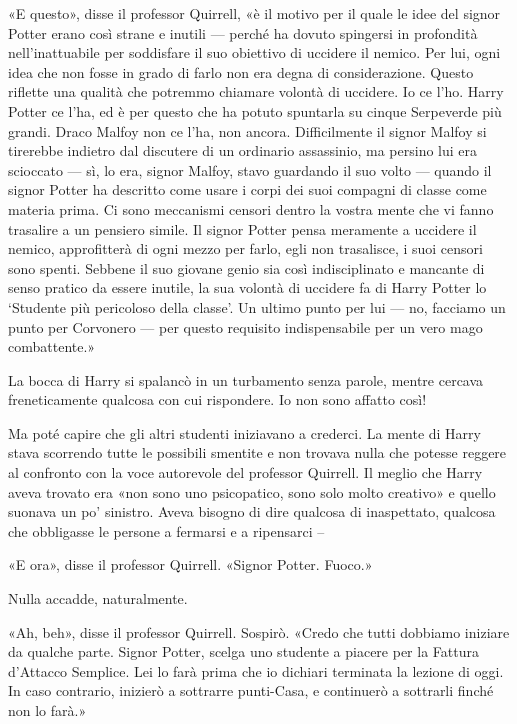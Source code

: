 «E questo», disse il professor Quirrell, «è il motivo per il quale le idee del signor Potter erano così strane e inutili — perché ha dovuto spingersi in profondità nell’inattuabile per soddisfare il suo obiettivo di uccidere il nemico. Per lui, ogni idea che non fosse in grado di farlo non era degna di considerazione. Questo riflette una qualità che potremmo chiamare volontà di uccidere. Io ce l’ho. Harry Potter ce l’ha, ed è per questo che ha potuto spuntarla su cinque Serpeverde più grandi. Draco Malfoy non ce l’ha, non ancora. Difficilmente il signor Malfoy si tirerebbe indietro dal discutere di un ordinario assassinio, ma persino lui era scioccato — sì, lo era, signor Malfoy, stavo guardando il suo volto — quando il signor Potter ha descritto come usare i corpi dei suoi compagni di classe come materia prima. Ci sono meccanismi censori dentro la vostra mente che vi fanno trasalire a un pensiero simile. Il signor Potter pensa meramente a uccidere il nemico, approfitterà di ogni mezzo per farlo, egli non trasalisce, i suoi censori sono spenti. Sebbene il suo giovane genio sia così indisciplinato e mancante di senso pratico da essere inutile, la sua volontà di uccidere fa di Harry Potter lo ‘Studente più pericoloso della classe’. Un ultimo punto per lui — no, facciamo un punto per Corvonero — per questo requisito indispensabile per un vero mago combattente.»

La bocca di Harry si spalancò in un turbamento senza parole, mentre cercava freneticamente qualcosa con cui rispondere. Io non sono affatto così!

Ma poté capire che gli altri studenti iniziavano a crederci. La mente di Harry stava scorrendo tutte le possibili smentite e non trovava nulla che potesse reggere al confronto con la voce autorevole del professor Quirrell. Il meglio che Harry aveva trovato era «non sono uno psicopatico, sono solo molto creativo» e quello suonava un po’ sinistro. Aveva bisogno di dire qualcosa di inaspettato, qualcosa che obbligasse le persone a fermarsi e a ripensarci –

«E ora», disse il professor Quirrell. «Signor Potter. Fuoco.»

Nulla accadde, naturalmente.

«Ah, beh», disse il professor Quirrell. Sospirò. «Credo che tutti dobbiamo iniziare da qualche parte. Signor Potter, scelga uno studente a piacere per la Fattura d’Attacco Semplice. Lei lo farà prima che io dichiari terminata la lezione di oggi. In caso contrario, inizierò a sottrarre punti-Casa, e continuerò a sottrarli finché non lo farà.»

